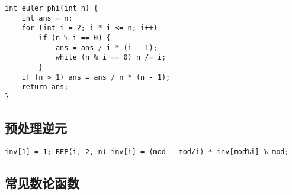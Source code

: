 \documentclass[a4paper,landscape,twocolumn]{ctexart}
\begin{document}
\begin{lstlisting}[]
int euler_phi(int n) {
	int ans = n;
	for (int i = 2; i * i <= n; i++)
		if (n % i == 0) {
			ans = ans / i * (i - 1);
			while (n % i == 0) n /= i;
		}
	if (n > 1) ans = ans / n * (n - 1);
	return ans;
}
\end{lstlisting}

\subsection{预处理逆元}

\begin{lstlisting}[]
inv[1] = 1; REP(i, 2, n) inv[i] = (mod - mod/i) * inv[mod%i] % mod;
\end{lstlisting}

%

%

\subsection{常见数论函数}
\end{document}
